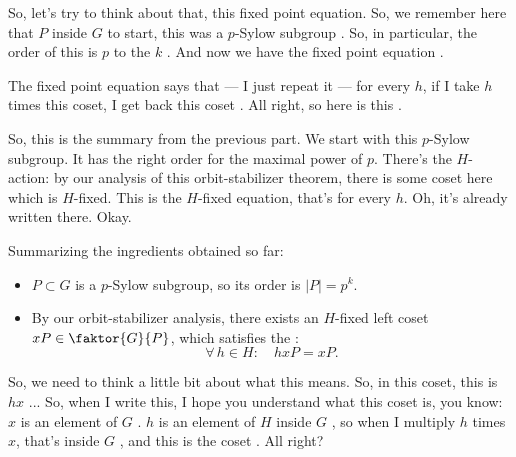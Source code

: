 \begin{proofWrapper}
\begin{speech}[00:29:24 - 00:30:35]
So, let's try to think about that, this fixed point equation. So, we remember here that $P$ inside $G$ to start, this was a $p$-Sylow subgroup . So, in particular, the order of this is $p$ to the $k$ . And now we have the fixed point equation .

The fixed point equation says that --- I just repeat it --- for every $h$, if I take $h$ times this coset, I get back this coset . All right, so here is this .

So, this is the summary from the previous part. We start with this $p$-Sylow subgroup. It has the right order for the maximal power of $p$. There's the $H$-action: by our analysis of this orbit-stabilizer theorem, there is some coset here which is $H$-fixed. This is the $H$-fixed equation, that's for every $h$. Oh, it's already written there. Okay.
\end{speech}

\begin{content}
Summarizing the ingredients obtained so far:
\begin{itemize}
    \item $P \subset G$ is a $p$-Sylow subgroup, so its order is $|P| = p^k$.
    \item By our orbit-stabilizer analysis, there exists an $H$-fixed left coset $x P \in \faktor{G}{P}$, which satisfies the :
    \begin{equation}\label{eq:fixed-point-equation-s2}
    \forall\, h \in H \colon \quad h x P = x P.
    \end{equation}
\end{itemize}
\end{content}

\begin{speech}[00:30:35 - 00:32:09]
So, we need to think a little bit about what this means. So, in this coset, this is $h x$ ... So, when I write this, I hope you understand what this coset is, you know: $x$ is an element of $G$ . $h$ is an element of $H$ inside $G$ , so when I multiply $h$ times $x$, that's inside $G$ , and this is the coset . All right?


\end{speech}
\end{proofWrapper}
